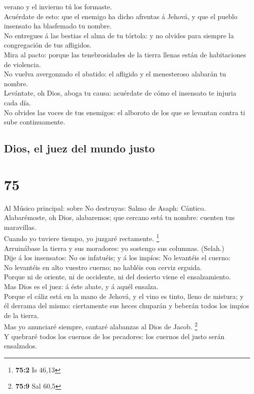 verano y el invierno tú los formaste.\\
 Acuérdate de esto: que el enemigo ha dicho afrentas á
Jehová, y que el pueblo insensato ha blasfemado tu nombre.\\
 No entregues á las bestias el alma de tu tórtola: y no
olvides para siempre la congregación de tus afligidos.\\
 Mira al pacto: porque las tenebrosidades de la tierra
llenas están de habitaciones de violencia.\\
 No vuelva avergonzado el abatido: el afligido y el
menesteroso alabarán tu nombre.\\
 Levántate, oh Dios, aboga tu causa: acuérdate de cómo el
insensato te injuria cada día.\\
 No olvides las voces de tus enemigos: el alboroto de los
que se levantan contra ti sube continuamente.

\hypertarget{dios-el-juez-del-mundo-justo}{%
\subsection{Dios, el juez del mundo
justo}\label{dios-el-juez-del-mundo-justo}}

\hypertarget{section-74}{%
\section{75}\label{section-74}}

 Al Músico principal: sobre No destruyas: Salmo de Asaph:
Cántico. Alabarémoste, oh Dios, alabaremos; que cercano está tu nombre:
cuenten tus maravillas.\\
 Cuando yo tuviere tiempo, yo juzgaré rectamente.
\footnote{\textbf{75:2} Is 46,13}\\
 Arruinábase la tierra y sus moradores: yo sostengo sus
columnas. (Selah.)\\
 Dije á los insensatos: No os infatuéis; y á los impíos:
No levantéis el cuerno:\\
 No levantéis en alto vuestro cuerno; no habléis con
cerviz erguida.\\
 Porque ni de oriente, ni de occidente, ni del desierto
viene el ensalzamiento.\\
 Mas Dios es el juez: á éste abate, y á aquél ensalza.\\
 Porque el cáliz está en la mano de Jehová, y el vino es
tinto, lleno de mistura; y él derrama del mismo: ciertamente sus heces
chuparán y beberán todos los impíos de la tierra.\\
 Mas yo anunciaré siempre, cantaré alabanzas al Dios de
Jacob. \footnote{\textbf{75:9} Sal 60,5}\\
 Y quebraré todos los cuernos de los pecadores: los
cuernos del justo serán ensalzados.

